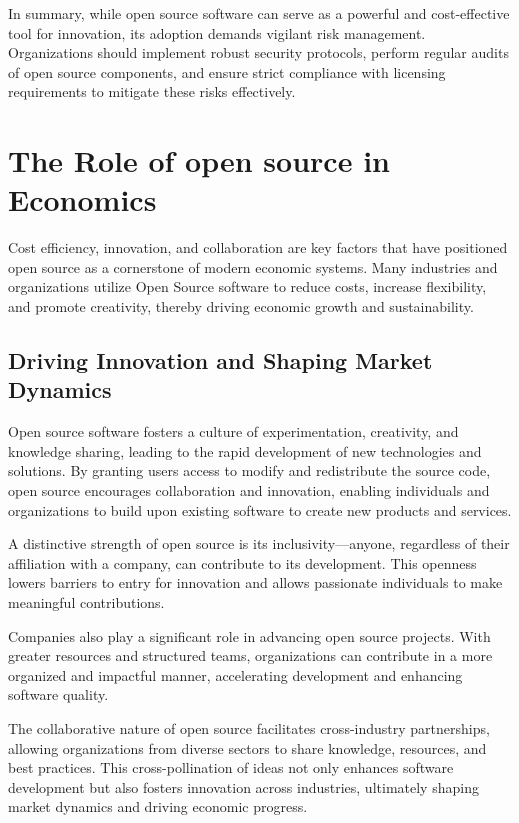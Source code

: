 \cite{OpenSource-Software-Risks-ConnectWise}

In summary, while open source software can serve as a powerful and cost-effective tool for innovation, its adoption demands vigilant risk management. Organizations should implement robust security protocols, perform regular audits of open source components, and ensure strict compliance with licensing requirements to mitigate these risks effectively.


\section{The Role of open source in Economics}

Cost efficiency, innovation, and collaboration are key factors that have positioned open source as a cornerstone of modern economic systems. Many industries and organizations utilize Open Source software to reduce costs, increase flexibility, 
and promote creativity, thereby driving economic growth and sustainability.

\subsection{Driving Innovation and Shaping Market Dynamics}

Open source software fosters a culture of experimentation, creativity, and knowledge sharing, 
leading to the rapid development of new technologies and solutions. By granting users access to modify and redistribute the source code, 
open source encourages collaboration and innovation, 
enabling individuals and organizations to build upon existing software to create new products and services.

A distinctive strength of open source is its inclusivity—anyone, regardless of their affiliation with a company,
can contribute to its development. 
This openness lowers barriers to entry for innovation and allows passionate individuals to make meaningful contributions.

Companies also play a significant role in advancing open source projects. 
With greater resources and structured teams, organizations can contribute in a more organized and impactful manner, 
accelerating development and enhancing software quality.

The collaborative nature of open source facilitates cross-industry partnerships, 
allowing organizations from diverse sectors to share knowledge, resources, and best practices. 
This cross-pollination of ideas not only enhances software development but also fosters innovation across industries, 
ultimately shaping market dynamics and driving economic progress.

